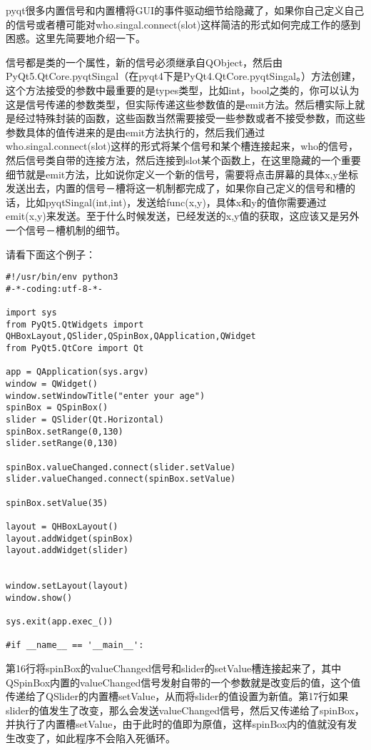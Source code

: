 \documentclass[11pt,oneside]{article}
\begin{document}
pyqt很多内置信号和内置槽将GUI的事件驱动细节给隐藏了，如果你自己定义自己的信号或者槽可能对who.singal.connect(slot)这样简洁的形式如何完成工作的感到困惑。这里先简要地介绍一下。

信号都是类的一个属性，新的信号必须继承自QObject，然后由PyQt5.QtCore.pyqtSingal（在pyqt4下是PyQt4.QtCore.pyqtSingal。）方法创建，这个方法接受的参数中最重要的是types类型，比如int，bool之类的，你可以认为这是信号传递的参数类型，但实际传递这些参数值的是emit方法。然后槽实际上就是经过特殊封装的函数，这些函数当然需要接受一些参数或者不接受参数，而这些参数具体的值传进来的是由emit方法执行的，然后我们通过who.singal.connect(slot)这样的形式将某个信号和某个槽连接起来，who的信号，然后信号类自带的连接方法，然后连接到slot某个函数上，在这里隐藏的一个重要细节就是emit方法，比如说你定义一个新的信号，需要将点击屏幕的具体x,y坐标发送出去，内置的信号－槽将这一机制都完成了，如果你自己定义的信号和槽的话，比如pyqtSingal(int,int)，发送给func(x,y)，具体x和y的值你需要通过emit(x,y)来发送。至于什么时候发送，已经发送的x,y值的获取，这应该又是另外一个信号－槽机制的细节。

请看下面这个例子：
\begin{verbatim}
#!/usr/bin/env python3
#-*-coding:utf-8-*-

import sys
from PyQt5.QtWidgets import QHBoxLayout,QSlider,QSpinBox,QApplication,QWidget
from PyQt5.QtCore import Qt

app = QApplication(sys.argv)
window = QWidget()
window.setWindowTitle("enter your age")
spinBox = QSpinBox()
slider = QSlider(Qt.Horizontal)
spinBox.setRange(0,130)
slider.setRange(0,130)

spinBox.valueChanged.connect(slider.setValue)
slider.valueChanged.connect(spinBox.setValue)

spinBox.setValue(35)

layout = QHBoxLayout()
layout.addWidget(spinBox)
layout.addWidget(slider)


window.setLayout(layout)
window.show()

sys.exit(app.exec_())

#if __name__ == '__main__':
\end{verbatim}

第16行将spinBox的valueChanged信号和slider的setValue槽连接起来了，其中QSpinBox内置的valueChanged信号发射自带的一个参数就是改变后的值，这个值传递给了QSlider的内置槽setValue，从而将slider的值设置为新值。第17行如果slider的值发生了改变，那么会发送valueChanged信号，然后又传递给了spinBox，并执行了内置槽setValue，由于此时的值即为原值，这样spinBox内的值就没有发生改变了，如此程序不会陷入死循环。
\end{document}
